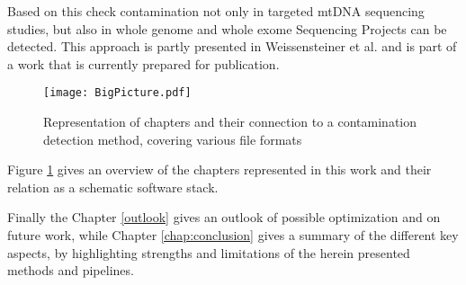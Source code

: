Based on this check contamination not only in targeted mtDNA sequencing studies, but also in whole genome and whole exome Sequencing Projects can be detected. This approach is partly presented in Weissensteiner et al. \cite{Weissensteiner2016b} and is part of a work that is currently prepared for publication.
\begin{figure}[ht]
\begin{center}
\texttt{[image: BigPicture.pdf]}
\caption[Representation of chapters]{Representation of chapters and their connection to a contamination detection method, covering various file formats }
\label{fig:figureBigPic}
\end{center}
\end{figure}

Figure \ref{fig:figureBigPic} gives an overview of the chapters represented in this work and their relation as a schematic software stack.

 
Finally the Chapter \ref{outlook} gives an outlook of possible optimization and on future work, while Chapter \ref{chap:conclusion} gives a summary of the different key aspects, by highlighting strengths and limitations of the herein presented methods and pipelines.



